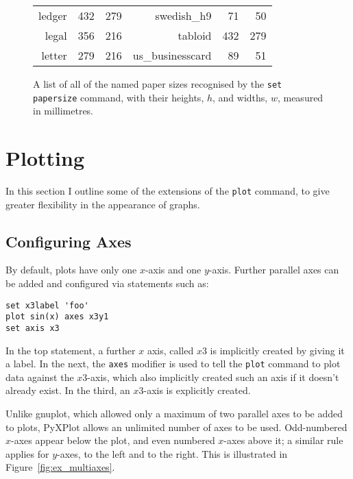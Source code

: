 \documentclass[a4paper,onecolumn,11pt]{book}
\begin{document}
\begin{figure}
\begin{tabular}{|rrr|rrr|}
                    ledger &    432 &    279 &       swedish\_h9 &     71 &     50 \\
                     legal &    356 &    216 &          tabloid &    432 &    279 \\
                    letter &    279 &    216 &  us\_businesscard &     89 &     51 \\
\hline
\end{tabular}
\caption{A list of all of the named paper sizes recognised by the \texttt{set papersize} command, with their heights, $h$, and widths, $w$, measured in millimetres.}
\label{paper_sizes}
\end{figure}

\section{Plotting}

In this section I outline some of the extensions of the \texttt{plot} command,
to give greater flexibility in the appearance of graphs.

\subsection{Configuring Axes}
\label{axis_extensions}\label{ranges_multiaxes}\label{multiple_axes}

By default, plots have only one $x$-axis and one $y$-axis. Further parallel
axes can be added and configured via statements such as:

\begin{verbatim}
set x3label 'foo'
plot sin(x) axes x3y1
set axis x3
\end{verbatim}

\noindent In the top statement, a further $x$ axis, called $x3$ is implicitly
created by giving it a label. In the next, the \texttt{axes} modifier is used
to tell the \texttt{plot} command to plot data against the $x3$-axis, which
also implicitly created such an axis if it doesn't already exist. In the third,
an $x3$-axis is explicitly created.

Unlike gnuplot, which allowed only a maximum of two parallel axes to be added
to plots, PyXPlot allows an unlimited number of axes to be used. Odd-numbered
$x$-axes appear below the plot, and even numbered $x$-axes above it; a similar
rule applies for $y$-axes, to the left and to the right. This is illustrated in
Figure~\ref{fig:ex_multiaxes}.
\end{document}
